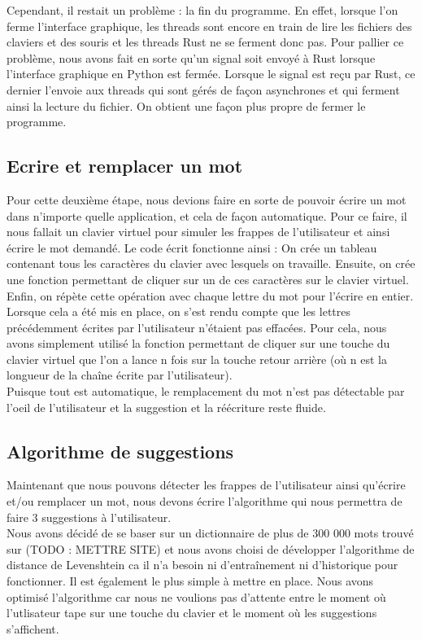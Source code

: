 \documentclass[a4paper, 11pt]{report}
\begin{document}
Cependant, il restait un problème : la fin du programme. En effet, lorsque l'on ferme l'interface graphique, les threads sont encore en train de lire les fichiers des claviers et des souris et les threads Rust ne se ferment donc pas. Pour pallier ce problème, nous avons fait en sorte qu'un signal soit envoyé à Rust lorsque l'interface graphique en Python est fermée. Lorsque le signal est reçu par Rust, ce dernier l'envoie aux threads qui sont gérés de façon asynchrones et qui ferment ainsi la lecture du fichier. On obtient une façon plus propre de fermer le programme. 


\subsection{Ecrire et remplacer un mot}

Pour cette deuxième étape, nous devions faire en sorte de pouvoir écrire un mot dans n'importe quelle application, et cela de façon automatique. Pour ce faire,  il nous fallait un clavier virtuel pour simuler les frappes de l'utilisateur et ainsi écrire le mot demandé. 
Le code écrit fonctionne ainsi : On crée un tableau contenant tous les caractères du clavier avec lesquels on travaille. Ensuite, on crée une fonction permettant de cliquer sur un de ces caractères sur le clavier virtuel. Enfin, on répète cette opération avec chaque lettre du mot pour l'écrire en entier. \\

Lorsque cela a été mis en place, on s'est rendu compte que les lettres précédemment écrites par l'utilisateur n'étaient pas effacées. Pour cela,  nous avons simplement utilisé la fonction permettant de cliquer sur une touche du clavier virtuel que l'on a lance n fois sur la touche retour arrière (où n est la longueur de la chaîne écrite par l'utilisateur). \\
Puisque tout est automatique, le remplacement du mot n'est pas détectable par l'oeil de l'utilisateur et la suggestion et la réécriture reste fluide. 

\subsection{Algorithme de suggestions}

Maintenant que nous pouvons détecter les frappes de l'utilisateur ainsi qu'écrire et/ou remplacer un mot, nous devons écrire l'algorithme qui nous permettra de faire 3 suggestions à l'utilisateur.\\
Nous avons décidé de se baser sur un dictionnaire de plus de 300 000 mots trouvé sur (TODO : METTRE SITE) et nous avons choisi de développer l'algorithme de distance de Levenshtein ca il n'a besoin ni d'entraînement ni d'historique pour fonctionner. Il est également le plus simple à mettre en place. Nous avons optimisé l'algorithme car nous ne voulions pas d'attente entre le moment où l'utlisateur tape sur une touche du clavier et le moment où les suggestions s'affichent. \\
\end{document}
